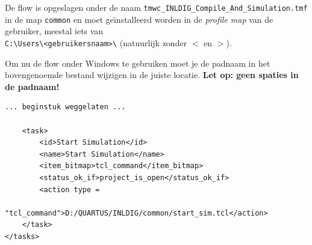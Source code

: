 \documentclass[a4paper,12pt,fleqn,twoside]{book}
\begin{document}
De flow is opgeslagen onder de naam
\lstinline|tmwc_INLDIG_Compile_And_Simulation.tmf| in de map \lstinline|common|
en moet ge\"{\i}nstalleerd worden in de \textsl{profile map} van de gebruiker,
meestal iets van\\ \lstinline|C:\Users\<gebruikersnaam>\| (natuurlijk zonder
$<$ en $>$).

Om nu de flow onder Windows te gebruiken moet je de padnaam in het bovengenoemde
bestand wijzigen in de juiste locatie.
\textbf{Let op: geen spaties in de padnaam!}

\bigskip
\begin{lstlisting}[numbers=none]
... beginstuk weggelaten ...

    <task> 
        <id>Start Simulation</id> 
        <name>Start Simulation</name> 
        <item_bitmap>tcl_command</item_bitmap> 
        <status_ok_if>project_is_open</status_ok_if> 
        <action type =
            "tcl_command">D:/QUARTUS/INLDIG/common/start_sim.tcl</action> 
    </task> 
</tasks> 
\end{lstlisting}
\end{document}
